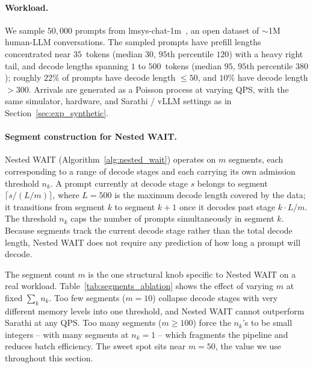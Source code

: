 \paragraph{Workload.}
We sample $50{,}000$ prompts from lmsys-chat-1m~\citep{zheng2023lmsys}, an open dataset of $\sim$1M human-LLM conversations. The sampled prompts have prefill lengths concentrated near $35$~tokens (median $30$, $95$th percentile $120$) with a heavy right tail, and decode lengths spanning $1$ to $500$~tokens (median $95$, $95$th percentile $380$); roughly $22\%$ of prompts have decode length $\leq 50$, and $10\%$ have decode length $> 300$. Arrivals are generated as a Poisson process at varying QPS, with the same simulator, hardware, and Sarathi / vLLM settings as in Section~\ref{sec:exp_synthetic}.

\paragraph{Segment construction for Nested WAIT.}
Nested WAIT (Algorithm~\ref{alg:nested_wait}) operates on $m$ segments, each corresponding to a range of decode stages and each carrying its own admission threshold $n_k$. A prompt currently at decode stage $s$ belongs to segment $\lceil s / (L/m) \rceil$, where $L = 500$ is the maximum decode length covered by the data; it transitions from segment $k$ to segment $k{+}1$ once it decodes past stage $k \cdot L/m$. The threshold $n_k$ caps the number of prompts simultaneously in segment $k$. Because segments track the current decode stage rather than the total decode length, Nested WAIT does not require any prediction of how long a prompt will decode.

The segment count $m$ is the one structural knob specific to Nested WAIT on a real workload. Table~\ref{tab:segments_ablation} shows the effect of varying $m$ at fixed $\sum_k n_k$. Too few segments ($m = 10$) collapse decode stages with very different memory levels into one threshold, and Nested WAIT cannot outperform Sarathi at any QPS. Too many segments ($m \geq 100$) force the $n_k$'s to be small integers -- with many segments at $n_k = 1$ -- which fragments the pipeline and reduces batch efficiency. The sweet spot sits near $m = 50$, the value we use throughout this section.

